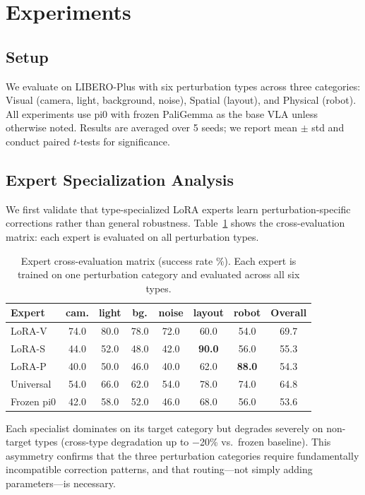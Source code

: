 \documentclass[conference]{article}
\newcommand{\liberoplus}{LIBERO-Plus}
\begin{document}
\section{Experiments}

\subsection{Setup}

We evaluate on \liberoplus{} with six perturbation types across three categories: Visual (camera, light, background, noise), Spatial (layout), and Physical (robot).
All experiments use pi0 with frozen PaliGemma as the base VLA unless otherwise noted.
Results are averaged over 5 seeds; we report mean $\pm$ std and conduct paired $t$-tests for significance.

\subsection{Expert Specialization Analysis}
\label{sec:expert_spec}

We first validate that type-specialized LoRA experts learn perturbation-specific corrections rather than general robustness.
Table~\ref{tab:cross_eval} shows the cross-evaluation matrix: each expert is evaluated on all perturbation types.

\begin{table}[h]
\centering
\caption{Expert cross-evaluation matrix (success rate \%). Each expert is trained on one perturbation category and evaluated across all six types.}
\label{tab:cross_eval}
\small
\begin{tabular}{lcccccc|c}
\toprule
Expert & cam. & light & bg. & noise & layout & robot & Overall \\
\midrule
LoRA-V & 74.0 & 80.0 & 78.0 & 72.0 & 60.0 & 54.0 & 69.7 \\
LoRA-S & 44.0 & 52.0 & 48.0 & 42.0 & \textbf{90.0} & 56.0 & 55.3 \\
LoRA-P & 40.0 & 50.0 & 46.0 & 40.0 & 62.0 & \textbf{88.0} & 54.3 \\
Universal & 54.0 & 66.0 & 62.0 & 54.0 & 78.0 & 74.0 & 64.8 \\
Frozen pi0 & 42.0 & 58.0 & 52.0 & 46.0 & 68.0 & 56.0 & 53.6 \\
\bottomrule
\end{tabular}
\end{table}

Each specialist dominates on its target category but degrades severely on non-target types (cross-type degradation up to $-$20\% vs.\ frozen baseline).
This asymmetry confirms that the three perturbation categories require fundamentally incompatible correction patterns, and that routing---not simply adding parameters---is necessary.
\end{document}
